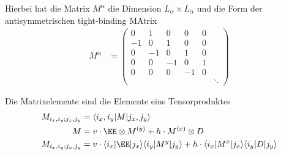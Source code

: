 Hierbei hat  die Matrix $M^{\alpha}$ die Dimension $L_\alpha\times L_\alpha$ und die Form der antisymmetrischen tight-binding MAtrix
\begin{align*}
    M^{\alpha}
    &=
    \begin{pmatrix}
    0&1&0&0&0\\
    -1&0&1&0&0\\
    0&-1&0&1&0\\
    0&0&-1&0&1\\
       0& 0&0&-1&0\\
       &&&&&\ddots
    \end{pmatrix}
\end{align*}


Die Matrixelemente sind die Elemente eins Tensorproduktes
\begin{align*}
    M_{i_x,i_y;j_x,j_y} &= \langle i_x,i_y | M |j_x,j_y\rangle\\
    M   &= v\cdot \EE\otimes M^{(y)} +  h\cdot M^{(x)}\otimes D\\
    M_{i_x,i_y;j_x,j_y} &= v\cdot\langle i_x | \EE |j_x\rangle \langle i_y | M^{y} |j_y\rangle +
    h\cdot \langle i_x | M^{x} |j_x\rangle \langle i_y | D |j_y\rangle
\end{align*}

